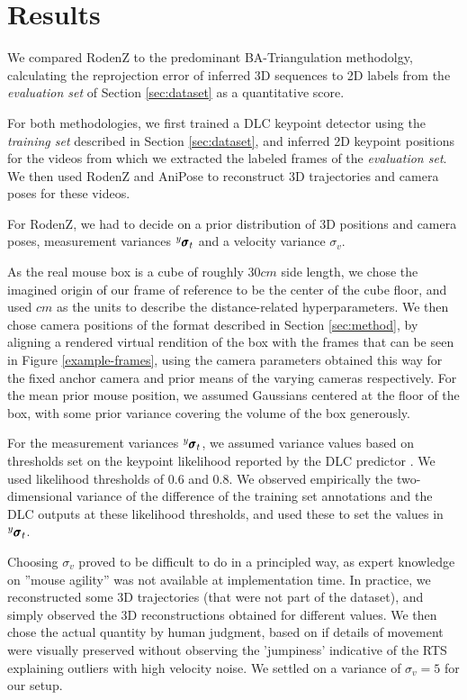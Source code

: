 \documentclass[sigconf, nonacm]{acmart}
\begin{document}
\section{Results}
\label{sec:results}
We compared RodenZ to the predominant BA-Triangulation methodolgy, calculating the reprojection error of inferred 3D sequences to 2D labels from the \emph{evaluation set} of Section \ref{sec:dataset} as a quantitative score. \par
For both methodologies, we first trained a DLC keypoint detector using the \emph{training set} described in Section \ref{sec:dataset}, and inferred 2D keypoint positions for the videos from which we extracted the labeled frames of the \emph{evaluation set}. We then used RodenZ and AniPose to reconstruct 3D trajectories and camera poses for these videos. \par 
For RodenZ, we had to decide on a prior distribution of 3D positions and camera poses, measurement variances $\prescript{y}{}{}\pmb\sigma_t$ and a velocity variance $\sigma_v$. \par
As the real mouse box is a cube of roughly $30cm$ side length, we chose the imagined origin of our frame of reference to be the center of the cube floor, and used $cm$ as the units to describe the distance-related hyperparameters. We then chose camera positions of the format described in Section \ref{sec:method}, by aligning a rendered virtual rendition of the box with the frames that can be seen in Figure \ref{example-frames}, using the camera parameters obtained this way for the fixed anchor camera and prior means of the varying cameras respectively. For the mean prior mouse position, we assumed Gaussians centered at the floor of the box, with some prior variance covering the volume of the box generously. \par
For the measurement variances $\prescript{y}{}{}\pmb\sigma_t$, we assumed variance values based on thresholds set on the keypoint likelihood reported by the DLC predictor \cite{Nath2019}. We used likelihood thresholds of $0.6$ and $0.8$. We observed empirically the two-dimensional variance of the difference of the training set annotations and the DLC outputs at these likelihood thresholds, and used these to set the values in $\prescript{y}{}{}\pmb\sigma_t$. \par
Choosing $\sigma_v$ proved to be difficult to do in a principled way, as expert knowledge on ''mouse agility'' was not available at implementation time. In practice, we reconstructed some 3D trajectories (that were not part of the dataset), and simply observed the 3D reconstructions obtained for different values. We then chose the actual quantity by human judgment, based on if details of movement were visually preserved without observing the 'jumpiness' indicative of the RTS explaining outliers with high velocity noise. We settled on a variance of $\sigma_v = 5$ for our setup. \par
\end{document}
